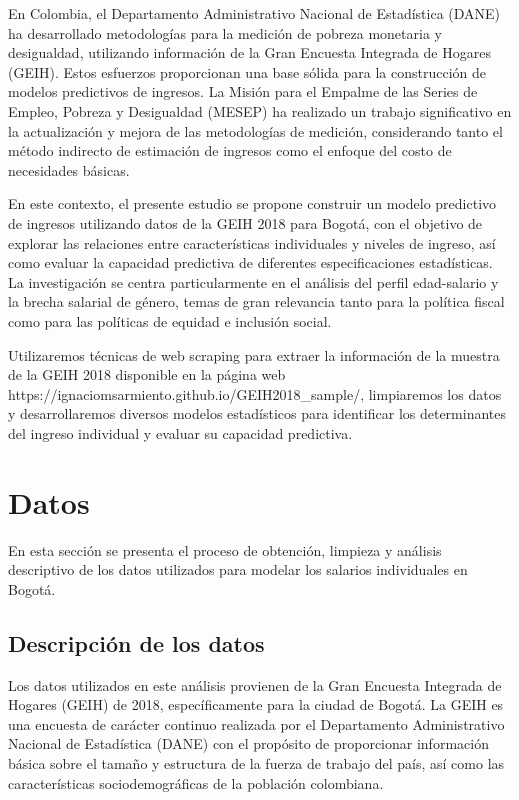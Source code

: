 \documentclass[12pt,a4paper,onecolumn]{article}
\begin{document}
En Colombia, el Departamento Administrativo Nacional de Estadística (DANE) ha desarrollado metodologías para la medición de pobreza monetaria y desigualdad, utilizando información de la Gran Encuesta Integrada de Hogares (GEIH). Estos esfuerzos proporcionan una base sólida para la construcción de modelos predictivos de ingresos. La Misión para el Empalme de las Series de Empleo, Pobreza y Desigualdad (MESEP) ha realizado un trabajo significativo en la actualización y mejora de las metodologías de medición, considerando tanto el método indirecto de estimación de ingresos como el enfoque del costo de necesidades básicas.


En este contexto, el presente estudio se propone construir un modelo predictivo de ingresos utilizando datos de la GEIH 2018 para Bogotá, con el objetivo de explorar las relaciones entre características individuales y niveles de ingreso, así como evaluar la capacidad predictiva de diferentes especificaciones estadísticas. La investigación se centra particularmente en el análisis del perfil edad-salario y la brecha salarial de género, temas de gran relevancia tanto para la política fiscal como para las políticas de equidad e inclusión social.


Utilizaremos técnicas de web scraping para extraer la información de la muestra de la GEIH 2018 disponible en la página web https://ignaciomsarmiento.github.io/GEIH2018\_sample/, limpiaremos los datos y desarrollaremos diversos modelos estadísticos para identificar los determinantes del ingreso individual y evaluar su capacidad predictiva.


\section{Datos}
En esta sección se presenta el proceso de obtención, limpieza y análisis descriptivo de los datos utilizados para modelar los salarios individuales en Bogotá.


\subsection{Descripción de los datos}

Los datos utilizados en este análisis provienen de la Gran Encuesta Integrada de Hogares (GEIH) de 2018, específicamente para la ciudad de Bogotá. La GEIH es una encuesta de carácter continuo realizada por el Departamento Administrativo Nacional de Estadística (DANE) con el propósito de proporcionar información básica sobre el tamaño y estructura de la fuerza de trabajo del país, así como las características sociodemográficas de la población colombiana.
\end{document}
